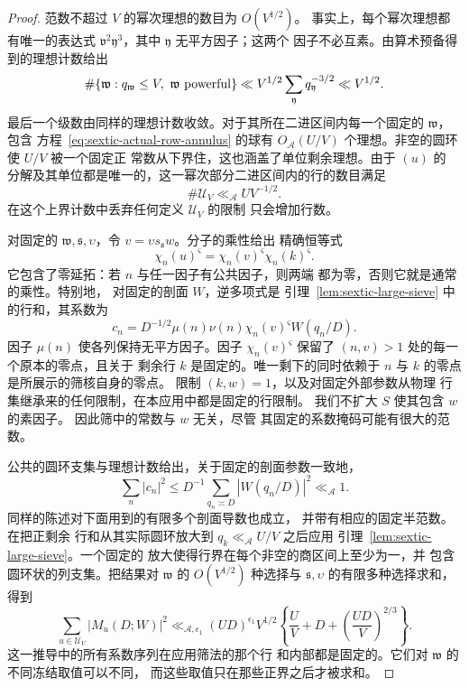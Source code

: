 \documentclass[11pt,a4paper]{article}
\numberwithin{equation}{section}
\numberwithin{figure}{section}
\theoremstyle{definition}
\theoremstyle{remark}
\begin{document}
\begin{proof}
范数不超过 $V$ 的幂次理想的数目为 $O(V^{1/2})$。
事实上，每个幂次理想都有唯一的表达式
$\mathfrak v^2\mathfrak y^3$，其中 $\mathfrak y$ 无平方因子；这两个
因子不必互素。由算术预备得到的理想计数给出
\[
 \#\{\mathfrak w:q_{\mathfrak w}\le V,\ \mathfrak w\ {\rm powerful}\}
 \ll V^{1/2}\sum_{\mathfrak y}q_{\mathfrak y}^{-3/2}
 \ll V^{1/2}.
\]
最后一个级数由同样的理想计数收敛。对于其所在二进区间内每一个固定的
$\mathfrak w$，包含
方程~\eqref{eq:sextic-actual-row-annulus} 的球有 $O_{\mathcal A}(U/V)$
个理想。非空的圆环使 $U/V$ 被一个固定正
常数从下界住，这也涵盖了单位剩余理想。由于 $(u)$ 的
分解及其单位都是唯一的，这一幂次部分二进区间内的行的数目满足
\begin{equation}\label{eq:sextic-stratum-cardinality}
 \#\mathcal U_V\ll_{\mathcal A}U V^{-1/2}.
\end{equation}
在这个上界计数中丢弃任何定义 $\mathcal U_V$ 的限制
只会增加行数。

对固定的 $\mathfrak w,\mathfrak s,\upsilon$，令
$v=\upsilon s_{\mathfrak s}w$。分子的乘性给出
精确恒等式
\begin{equation}\label{eq:sextic-frozen-mask}
 \chi_n(u)^{\varsigma}
   =\chi_n(v)^{\varsigma}\chi_n(k)^{\varsigma}.
\end{equation}
它包含了零延拓：若 $n$ 与任一因子有公共因子，则两端
都为零，否则它就是通常的乘性。特别地，
对固定的剖面 $W$，逆多项式是
引理~\ref{lem:sextic-large-sieve} 中的行和，其系数为
\[
 c_n=D^{-1/2}\mu(n)\nu(n)\chi_n(v)^{\varsigma}W(q_n/D).
\]
因子 $\mu(n)$ 使各列保持无平方因子。因子
$\chi_n(v)^{\varsigma}$ 保留了 $(n,v)>1$ 处的每一个原本的零点，且关于
剩余行 $k$ 是固定的。唯一剩下的同时依赖于
$n$ 与 $k$ 的零点是所展示的筛核自身的零点。
限制 $(k,w)=1$，以及对固定外部参数从物理
行集继承来的任何限制，在本应用中都是固定的行限制。
我们不扩大 $S$ 使其包含 $w$ 的素因子。
因此筛中的常数与 $w$ 无关，尽管
其固定的系数掩码可能有很大的范数。

公共的圆环支集与理想计数给出，关于固定的剖面参数一致地，
\[
 \sum_n|c_n|^2
 \le D^{-1}\sum_{q_n\asymp D}|W(q_n/D)|^2\ll_{\mathcal A}1.
\]
同样的陈述对下面用到的有限多个剖面导数也成立，
并带有相应的固定半范数。在把正剩余
行和从其实际圆环放大到 $q_k\ll_{\mathcal A}U/V$ 之后应用
引理~\ref{lem:sextic-large-sieve}。一个固定的
放大使得行界在每个非空的商区间上至少为一，并
包含圆环状的列支集。把结果对
$\mathfrak w$ 的 $O(V^{1/2})$ 种选择与
$\mathfrak s,\upsilon$ 的有限多种选择求和，得到
\begin{equation}\label{eq:sextic-stratum-fixed-moment}
 \sum_{u\in\mathcal U_V}|M_u(D;W)|^2
 \ll_{\mathcal A,\epsilon_1}(UD)^{\epsilon_1}V^{1/2}
 \left\{\frac UV+D+\left(\frac{UD}{V}\right)^{2/3}\right\}.
\end{equation}
这一推导中的所有系数序列在应用筛法的那个行
和内部都是固定的。它们对 $\mathfrak w$ 的不同冻结取值可以不同，
而这些取值只在那些正界之后才被求和。


\end{proof}
\end{document}
